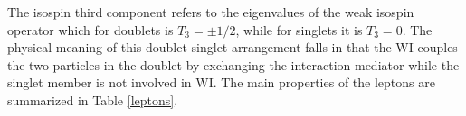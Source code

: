 The isospin third component refers to the eigenvalues of the weak isospin operator which for doublets is $T_3 = \pm 1/2$, while for singlets it is $T_3=0$. The physical meaning of this doublet-singlet arrangement falls in that the WI couples the two particles in the doublet by exchanging the interaction mediator while the singlet member is not involved in WI. The main properties of the leptons are summarized in Table \ref{leptons}.






